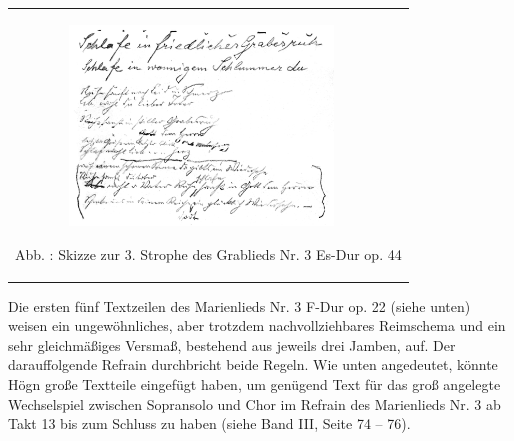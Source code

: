 \begin{center}
\begin{minipage}{10.264cm}
\begin{flushleft}
\tablefirsthead{}
\tablehead{}
\tabletail{}
\tablelasttail{}
\begin{supertabular}{m{10.064cm}}

\includegraphics[width=9.881cm,height=5.323cm]{pictures/zulassungsarbeit-img071.png}

Abb. : Skizze zur 3. Strophe des Grablieds Nr.
3 Es-Dur op. 44\\
\end{supertabular}
\end{flushleft}
\end{minipage}
\end{center}
Die ersten fünf Textzeilen des Marienlieds Nr. 3 F-Dur op. 22 (siehe
unten) weisen ein ungewöhnliches, aber trotzdem nachvollziehbares
Reimschema und ein sehr gleichmäßiges Versmaß, bestehend aus jeweils
drei Jamben, auf. Der darauffolgende Refrain durchbricht beide Regeln.
Wie unten angedeutet, könnte Högn große Textteile eingefügt haben, um
genügend Text für das groß angelegte Wechselspiel zwischen Sopransolo
und Chor im Refrain des Marienlieds Nr. 3 ab Takt 13 bis zum Schluss zu
haben (siehe Band III, Seite 74 – 76).

